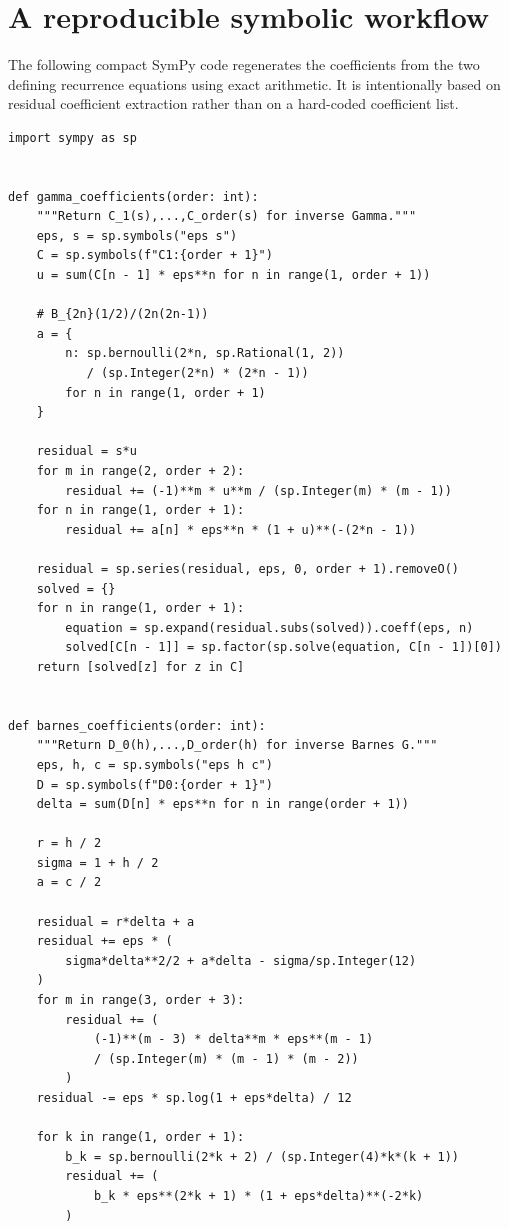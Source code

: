 \documentclass[11pt]{article}
\theoremstyle{definition}
\theoremstyle{remark}
\begin{document}
\section{A reproducible symbolic workflow}\label{sec:code}

The following compact SymPy code regenerates the coefficients from the two defining recurrence equations using exact arithmetic.  It is intentionally based on residual coefficient extraction rather than on a hard-coded coefficient list.

\begin{lstlisting}[style=pythonstyle,caption={Exact symbolic generation of the inverse coefficients.}]
import sympy as sp


def gamma_coefficients(order: int):
    """Return C_1(s),...,C_order(s) for inverse Gamma."""
    eps, s = sp.symbols("eps s")
    C = sp.symbols(f"C1:{order + 1}")
    u = sum(C[n - 1] * eps**n for n in range(1, order + 1))

    # B_{2n}(1/2)/(2n(2n-1))
    a = {
        n: sp.bernoulli(2*n, sp.Rational(1, 2))
           / (sp.Integer(2*n) * (2*n - 1))
        for n in range(1, order + 1)
    }

    residual = s*u
    for m in range(2, order + 2):
        residual += (-1)**m * u**m / (sp.Integer(m) * (m - 1))
    for n in range(1, order + 1):
        residual += a[n] * eps**n * (1 + u)**(-(2*n - 1))

    residual = sp.series(residual, eps, 0, order + 1).removeO()
    solved = {}
    for n in range(1, order + 1):
        equation = sp.expand(residual.subs(solved)).coeff(eps, n)
        solved[C[n - 1]] = sp.factor(sp.solve(equation, C[n - 1])[0])
    return [solved[z] for z in C]


def barnes_coefficients(order: int):
    """Return D_0(h),...,D_order(h) for inverse Barnes G."""
    eps, h, c = sp.symbols("eps h c")
    D = sp.symbols(f"D0:{order + 1}")
    delta = sum(D[n] * eps**n for n in range(order + 1))

    r = h / 2
    sigma = 1 + h / 2
    a = c / 2

    residual = r*delta + a
    residual += eps * (
        sigma*delta**2/2 + a*delta - sigma/sp.Integer(12)
    )
    for m in range(3, order + 3):
        residual += (
            (-1)**(m - 3) * delta**m * eps**(m - 1)
            / (sp.Integer(m) * (m - 1) * (m - 2))
        )
    residual -= eps * sp.log(1 + eps*delta) / 12

    for k in range(1, order + 1):
        b_k = sp.bernoulli(2*k + 2) / (sp.Integer(4)*k*(k + 1))
        residual += (
            b_k * eps**(2*k + 1) * (1 + eps*delta)**(-2*k)
        )


\end{lstlisting}
\end{document}
